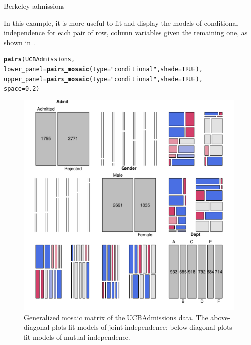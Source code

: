 \documentclass[11pt]{book}\usepackage[]{graphicx}\usepackage[]{color}
\makeatletter
\newcommand{\hlnum}[1]{\textcolor[rgb]{0.686,0.059,0.569}{#1}}%
\newcommand{\hlstr}[1]{\textcolor[rgb]{0.192,0.494,0.8}{#1}}%
\newcommand{\hlstd}[1]{\textcolor[rgb]{0.345,0.345,0.345}{#1}}%
\newcommand{\hlkwc}[1]{\textcolor[rgb]{0.333,0.667,0.333}{#1}}%
\newcommand{\hlkwd}[1]{\textcolor[rgb]{0.737,0.353,0.396}{\textbf{#1}}}%
\newenvironment{kframe}{%
 \def\at@end@of@kframe{}%
 \ifinner\ifhmode%
  \def\at@end@of@kframe{\end{minipage}}%
  \begin{minipage}{\columnwidth}%
 \fi\fi%
 \def\FrameCommand##1{\hskip\@totalleftmargin \hskip-\fboxsep
 \colorbox{shadecolor}{##1}\hskip-\fboxsep
     \hskip-\linewidth \hskip-\@totalleftmargin \hskip\columnwidth}%
 \MakeFramed {\advance\hsize-\width
   \@totalleftmargin\z@ \linewidth\hsize
   \@setminipage}}%
 {\par\unskip\endMakeFramed%
 \at@end@of@kframe}
\newenvironment{knitrout}{}{} %
\renewenvironment{knitrout}{\small\renewcommand{\baselinestretch}{.85}}{} %
\makeatother
\begin{document}
\begin{Example}[berkeley4b]{Berkeley admissions}
\begin{knitrout}
\end{knitrout}


In this example, it is more useful to fit and display the models of conditional independence
for each pair of row, column variables given the remaining one, as shown in .
\begin{knitrout}
\color{fgcolor}\begin{kframe}
\begin{alltt}
\hlkwd{pairs}\hlstd{(UCBAdmissions,}
      \hlkwc{lower_panel} \hlstd{=} \hlkwd{pairs_mosaic}\hlstd{(}\hlkwc{type} \hlstd{=} \hlstr{"conditional"}\hlstd{,} \hlkwc{shade}\hlstd{=}\hlnum{TRUE}\hlstd{),}
      \hlkwc{upper_panel} \hlstd{=} \hlkwd{pairs_mosaic}\hlstd{(}\hlkwc{type} \hlstd{=} \hlstr{"conditional"}\hlstd{,} \hlkwc{shade}\hlstd{=}\hlnum{TRUE}\hlstd{),}
      \hlkwc{space}\hlstd{=}\hlnum{0.2}\hlstd{)}
\end{alltt}
\end{kframe}\begin{figure}[!htb]


\centerline{\includegraphics[width=.8\textwidth]{ch05/fig/berk-pairs3} }

\caption[Generalized mosaic matrix of the UCBAdmissions data]{Generalized mosaic matrix of the UCBAdmissions data. The above-diagonal plots fit models of joint independence; below-diagonal plots fit models of mutual independence.\label{fig:berk-pairs3}}
\end{figure}



\end{knitrout}
\end{Example}
\end{document}
